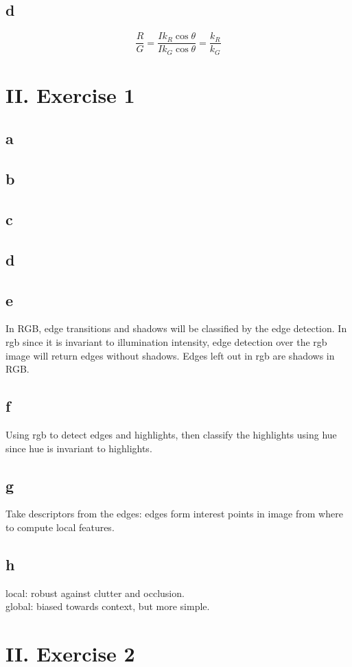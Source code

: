 \documentclass[a4paper,11pt]{article}
\begin{document}
	\subsection*{d}
	\[\frac{R}{G} = \frac{Ik_R \cos{\theta}}{Ik_G \cos{\theta}}=\frac{k_R}{k_G} \]		
	
	
	\section*{II. Exercise 1}
	\subsection*{a}
	\subsection*{b}
	\subsection*{c}
	\subsection*{d}
	\subsection*{e}
	In RGB, edge transitions and shadows will be classified by the edge detection. In rgb since it is invariant to illumination intensity, edge detection over the rgb image will return edges without shadows. Edges left out in rgb are shadows in RGB.
	\subsection*{f}
	Using rgb to detect edges and highlights, then classify the highlights using hue since hue is invariant to highlights.
	\subsection*{g}
	Take descriptors from the edges: edges form interest points in image from where to compute local features.
	\subsection*{h}
	local: robust against clutter and occlusion. \\
	global:	biased towards context, but more simple.
	
	\section*{II. Exercise 2}
\end{document}
